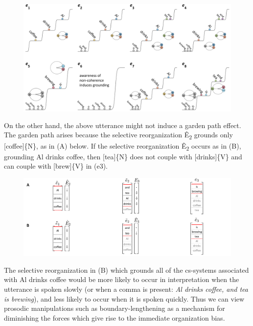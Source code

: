   
\begin{figure}
\includegraphics[width=\textwidth]{figures/Tilsen-img130.png}
\caption{\missingcaption}
\label{fig:}
\end{figure}
 

  On the other hand, the above utterance might not induce a garden path effect. The garden path arises because the selective reorganization Ê\textsubscript{2} grounds only [coffee]\{N\}, as in (A) below. If the selective reorganization Ê\textsubscript{2} occurs as in (B), grounding {\textbar}Al drinks coffee{\textbar}, then [tea]\{N\} does not couple with [drinks]\{V\} and can couple with [brew]\{V\} in (e3).

  
\begin{figure}
\includegraphics[width=\textwidth]{figures/Tilsen-img131.png}
\caption{\missingcaption}
\label{fig:}
\end{figure}
 

  The selective reorganization in (B) which grounds all of the cs-systems associated with {\textbar}Al drinks coffee{\textbar} would be more likely to occur in interpretation when the utterance is spoken slowly (or when a comma is present: \textit{Al drinks coffee, and tea is brewing}), and less likely to occur when it is spoken quickly. Thus we can view prosodic manipulations such as boundary-lengthening as a mechanism for diminishing the forces which give rise to the immediate organization bias.

